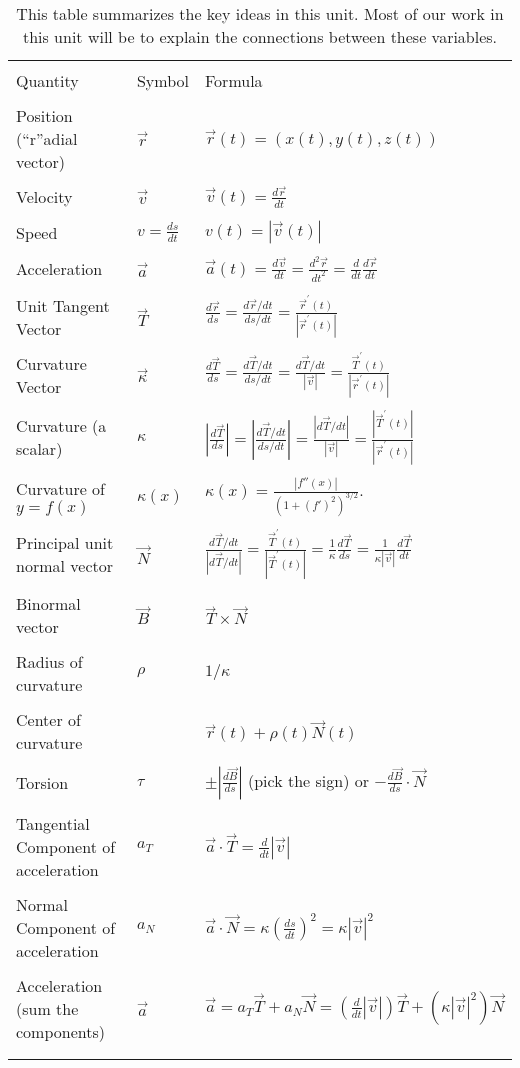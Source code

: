 \documentclass[10pt,]{book}
\theoremstyle{plain}
\theoremstyle{definition}
\theoremstyle{definition}
\theoremstyle{definition}
\theoremstyle{definition}
\theoremstyle{definition}
\numberwithin{equation}{section}
\newcommand{\hrulethin}  {\noalign{\hrule height 0.04em}}
\newcommand{\hrulemedium}{\noalign{\hrule height 0.07em}}
\newcommand{\ds}{\displaystyle}
\begin{document}
%
\begin{table}
\centering
\begin{tabular}{lll}
&&\tabularnewline\hrulethin
Quantity&Symbol&Formula\tabularnewline[0pt]
&&\tabularnewline\hrulemedium
Position (``r''adial vector)&\(\vec r\)&\(\vec r(t) = (x(t),y(t),z(t))\)\tabularnewline[0pt]
&&\tabularnewline\hrulethin
Velocity&\(\vec v\)&\(\ds \vec v(t) = \frac{d\vec r}{dt}\)\tabularnewline[0pt]
&&\tabularnewline\hrulethin
Speed&\(v = \ds\frac{ds}{dt}\)&\(\ds v(t) = |\vec v(t)|\)\tabularnewline[0pt]
&&\tabularnewline\hrulethin
Acceleration&\(\ds \vec a\)&\(\ds \vec a(t) = \frac{d \vec v}{dt}= \frac{d^2\vec r}{dt^2}= \frac{d}{dt}\frac{d\vec r}{dt}\)\tabularnewline[0pt]
&&\tabularnewline\hrulethin
Unit Tangent Vector&\(\vec T\)&\(\ds\frac{d\vec r}{ds} = \frac{d\vec r/dt}{ds/dt} = \frac{\vec r^\prime(t)}{|\vec r^\prime(t)|}\)\tabularnewline[0pt]
&&\tabularnewline\hrulethin
Curvature Vector&\(\vec \kappa\)&\(\ds\frac{d\vec T}{ds} =\frac{d\vec T/dt}{ds/dt} = \frac{d\vec T/dt}{|\vec v|} = \frac{\vec T^\prime(t)}{|\vec r^\prime(t)|}\)\tabularnewline[0pt]
&&\tabularnewline\hrulethin
Curvature (a scalar)&\(\kappa\)&\(\ds \left|\frac{d\vec T}{ds}\right| =\left|\frac{d\vec T/dt}{ds/dt}\right| = \frac{\left|d\vec T/dt\right|}{|\vec v|}= \frac{|\vec T^\prime(t)|}{|\vec r^\prime(t)|}\)\tabularnewline[0pt]
&&\tabularnewline\hrulethin
Curvature of \(y=f(x)\)&\(\kappa(x)\)&\(\ds \kappa(x) = \frac{|f''(x)|}{(1+(f')^2)^{3/2}}.\)\tabularnewline[0pt]
&&\tabularnewline\hrulethin
Principal unit normal vector&\(\vec N\)&\(\ds \frac{d\vec T/dt}{|d\vec T/dt|} =  \frac{\vec T^\prime(t)}{|\vec T^\prime(t)|}=\frac{1}{\kappa}\frac{d\vec T}{ds} = \frac{1}{\kappa |\vec v|}\frac{d\vec T}{dt}\)\tabularnewline[0pt]
&&\tabularnewline\hrulethin
Binormal vector&\(\vec B\)&\(\vec T\times\vec N\)\tabularnewline[0pt]
&&\tabularnewline\hrulethin
Radius of curvature&\(\rho\)&\(1/\kappa\)\tabularnewline[0pt]
&&\tabularnewline\hrulethin
Center of curvature&&\(\vec r(t)+\rho(t)\vec N(t)\)\tabularnewline[0pt]
&&\tabularnewline\hrulethin
Torsion&\(\tau\)&\(\ds \pm\left|\frac{d\vec B}{ds}\right|\) (pick the sign) or \(\ds-\frac{d\vec B}{ds}\cdot \vec N\)\tabularnewline[0pt]
&&\tabularnewline\hrulethin
Tangential Component of acceleration&\(a_T\)&\(\ds \vec a \cdot \vec T = \frac{d}{dt}|\vec v|\)\tabularnewline[0pt]
&&\tabularnewline\hrulethin
Normal Component of acceleration&\(a_N\)&\(\ds \vec a \cdot \vec N = \kappa \left(\frac{ds}{dt}\right)^2 = \kappa |\vec v|^2\)\tabularnewline[0pt]
&&\tabularnewline\hrulethin
Acceleration (sum the components)&\(\vec a\)&\(\vec a 
= a_T\vec T+a_N\vec N 
= \left(\frac{d}{dt}|\vec v|\right) \vec T 
+\left(\kappa |\vec v|^2\right) \vec N\)\tabularnewline[0pt]
&&\tabularnewline\hrulethin
\end{tabular}
\caption{This table summarizes the key ideas in this unit. Most of our work in this unit will be to explain the connections between these variables.\label{motion_table}}
\end{table}
\typeout{************************************************}
\typeout{************************************************}
\end{document}
